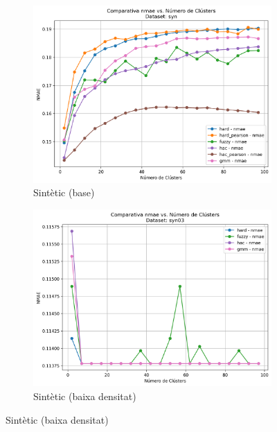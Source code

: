 \documentclass[a4paper,12pt]{report}
\begin{document}
\begin{figure}[H]
    \centering
    \begin{subfigure}[b]{0.49\textwidth}
        \includegraphics[width=\textwidth]{Figuras/FinalResults/nmae-pear-syn.png}
        \caption{Sintètic (base)}
        \label{fig:nmae-syn-a}
    \end{subfigure}
    \hfill
    \begin{subfigure}[b]{0.49\textwidth}
        \includegraphics[width=\textwidth]{Figuras/FinalResults/nmae-pear-syn03.png}
        \caption{Sintètic (baixa densitat)}
        \label{fig:nmae-syn03-b}
    \end{subfigure}

    \vspace{1em}


\end{figure}
\end{document}
